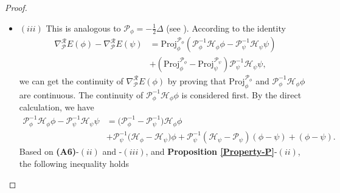\documentclass[preprint,3p]{elsarticle}
\begin{document}
\begin{proof}
\begin{itemize}[label={},left=0pt]
\begin{align*}
			&=C_{\phi}\left\langle\big(f'(\rho_{\phi})\big(|\phi|^2+\phi^2\overline{\cdot}\big)\big)v ,\mathcal{P}_{\phi}^{-1}\big(f'(\rho_{\phi})\big(|\phi|^2+\phi^2\overline{\cdot}\big)\big)v\right\rangle\\
			&\le C_{\phi}\left\|\mathcal{P}_{\phi}^{-1}\big(f'(\rho_{\phi})\big(|\phi|^2+\phi^2\overline{\cdot}\big)\big)v\right\|_{L^6}\left\|\big(f'(\rho_{\phi})\big(|\phi|^2+\phi^2\overline{\cdot}\big)\big)v\right\|_{L^{6/5}}\\
			&\le C_{\phi}\left\|\mathcal{P}_{\phi}^{-1}\big(f'(\rho_{\phi})\big(|\phi|^2+\phi^2\overline{\cdot}\big)\big)v\right\|_{H^1}\left\||\phi|^{\theta+1}|v|\right\|_{L^{6/5}}\\
			&\le C_{\phi}\left\|\mathcal{P}_{\phi}^{-1}\big(f'(\rho_{\phi})\big(|\phi|^2+\phi^2\overline{\cdot}\big)\big)v\right\|_{H^1}\|\phi\|^{\theta+1}_{L^{6}}\|v\|_{L^{p_0}}.
		\end{align*}
		\item $(iii)$  This is analogous to $\mathcal{P}_{\phi}=-\frac{1}{2}\Delta$ (see \cite[{\bf Lemma 5.2}]{2024On}). According to the identity
		\begin{align*}%
			\nabla_{\mathcal{P}}^{\mathcal{R}}E(\phi)-\nabla_{\mathcal{P}}^{\mathcal{R}}E(\psi)&=\text{Proj}^{\mathcal{P}_{\phi}}_{\phi}\left(\mathcal{P}^{-1}_{\phi}\mathcal{H}_{\phi}\phi-\mathcal{P}^{-1}_{\psi}\mathcal{H}_{\psi}\psi\right)\\
			&+\left(\text{Proj}_{\phi}^{\mathcal{P}_{\phi}}-\text{Proj}_{\psi}^{\mathcal{P}_{\psi}}\right)\mathcal{P}^{-1}_{\psi}\mathcal{H}_{\psi}\psi,
		\end{align*}
		we can get the continuity of $\nabla^{\mathcal{R}}_{\mathcal{P}} E(\phi)$ by proving that $\text{Proj}^{\mathcal{P}_{\phi}}_{\phi}$ and $\mathcal{P}_{\phi}^{-1}\mathcal{H}_{\phi}\phi$ are continuous. The continuity of $\mathcal{P}_{\phi}^{-1}\mathcal{H}_{\phi}\phi$ is considered first.
		By the direct calculation, we have
		\begin{align}
			\nonumber\mathcal{P}_{\phi}^{-1}\mathcal{H}_{\phi}\phi-\mathcal{P}_{\psi}^{-1}\mathcal{H}_{\psi}\psi&=\big(\mathcal{P}_{\phi}^{-1}-\mathcal{P}_{\psi}^{-1}\big)\mathcal{H}_{\phi}\phi\\
			&+\mathcal{P}_{\psi}^{-1}\big(\mathcal{H}_{\phi}-\mathcal{H}_{\psi}\big)\phi+\mathcal{P}_{\psi}^{-1}\left(\mathcal{H}_{\psi}-\mathcal{P}_{\psi}\right)(\phi-\psi)+(\phi-\psi).\label{four-part}
		\end{align}
		Based on {\bf (A6)}-$(ii)$ and -$(iii)$, and {\bf Proposition \ref{Property-P}}-$(ii)$, the following inequality holds

\end{itemize}
\end{proof}
\end{document}
